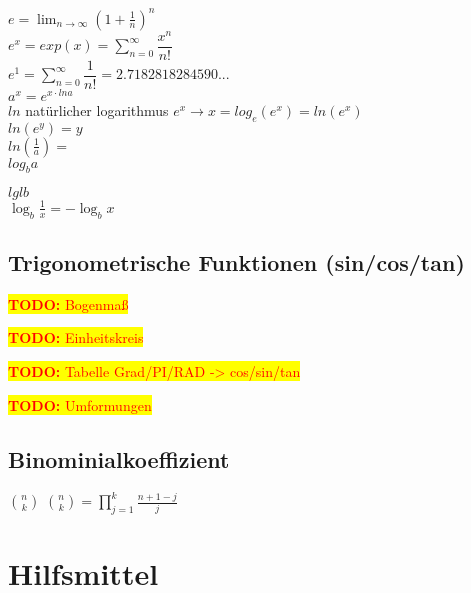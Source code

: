 \documentclass[10pt,a4paper]{article}
\newcommand{\todo}[1]{\begin{flushleft} \colorbox{yellow}{\textcolor{red}{\textbf{TODO:} {#1}}}\end{flushleft} }
\begin{document}
$ e = \lim_{n\to\infty} \left(1+\frac{1}{n}\right)^n $\\
$ e^{x} = exp(x) = \sum_{n=0}^\infty \dfrac{x^{n}}{n!} $ \\
$ e^{1} = \sum_{n=0}^\infty \dfrac{1}{n!} = 2.7182818284590...$\\
$ a^{x} = e^{x \cdot ln a}$\\

$ ln $ natürlicher logarithmus $ e^x \rightarrow x = log_e (e^x) = ln(e^x)$ \\
$ ln(e^y) = y $\\
$ ln(\frac{1}{a}) =  $\\

$ log_b a $ 

$ lg lb $\\
$ \log_b \frac 1x = -\log_b x $


\subsection{Trigonometrische Funktionen (sin/cos/tan)}


\todo{Bogenmaß}
\todo{Einheitskreis}

\todo{Tabelle Grad/PI/RAD -> cos/sin/tan}




\todo{Umformungen}

\subsection{Binominialkoeffizient}

$ \binom nk $
$ \binom nk = \prod_{j=1}^k \frac{n + 1 - j}j$





\section{Hilfsmittel}
\end{document}
